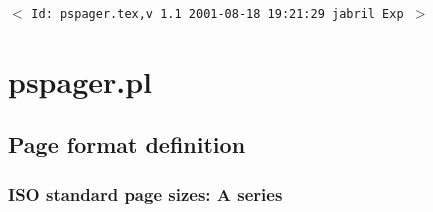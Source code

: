 \documentclass[11pt]{article}
\newcommand{\sctn}[1]{\section{#1}}
\newcommand{\subsctn}[1]{\subsection{#1}}
\newcommand{\subsubsctn}[1]{\subsubsection{#1}}
\begin{document}

\newpage
{}
\setcounter{page}{1}
\pagestyle{fancy}
\renewcommand{\sectionmark}[1]{\markboth{}{\thesection.\ #1}}
\renewcommand{\subsectionmark}[1]{\markboth{}{\thesubsection.\ \textsl{#1}}}

\tableofcontents
\listoftables
\listoffigures

\vfill
\begin{center}
{\small$<$ \verb$Id: pspager.tex,v 1.1 2001-08-18 19:21:29 jabril Exp $$>$ }
\end{center}


\newpage
{}
\setcounter{page}{1}

\sctn{pspager.pl}

\subsctn{Page format definition} %
\label{sec:PAGEdef}

\subsubsctn{ISO standard page sizes: A series}
\end{document}
